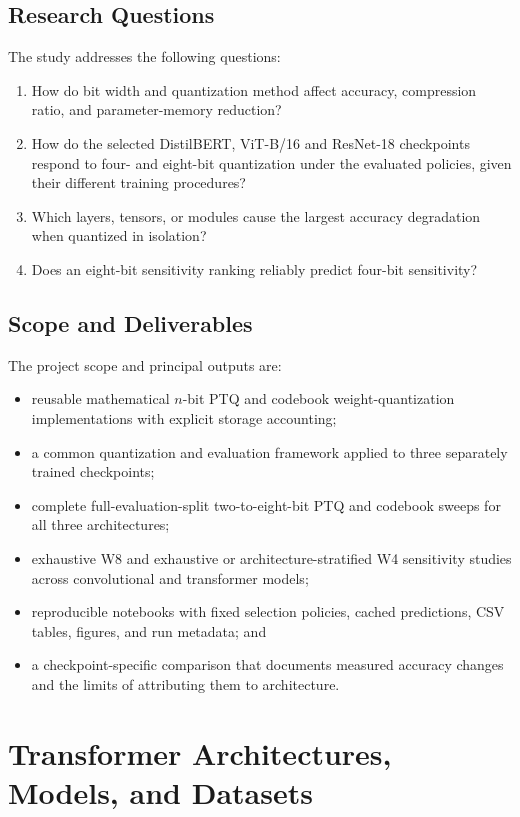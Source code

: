 \documentclass[conference]{IEEEtran}
\begin{document}
\subsection{Research Questions}

The study addresses the following questions:
\begin{enumerate}
    \item How do bit width and quantization method affect accuracy, compression ratio, and parameter-memory reduction?
    \item How do the selected DistilBERT, ViT-B/16 and ResNet-18 checkpoints respond to four- and eight-bit quantization under the evaluated policies, given their different training procedures?
    \item Which layers, tensors, or modules cause the largest accuracy degradation when quantized in isolation?
    \item Does an eight-bit sensitivity ranking reliably predict four-bit sensitivity?
\end{enumerate}

\subsection{Scope and Deliverables}

The project scope and principal outputs are:
\begin{itemize}
    \item reusable mathematical $n$-bit PTQ and codebook weight-quantization implementations with explicit storage accounting;
    \item a common quantization and evaluation framework applied to three separately trained checkpoints;
    \item complete full-evaluation-split two-to-eight-bit PTQ and codebook sweeps for all three architectures;
    \item exhaustive W8 and exhaustive or architecture-stratified W4 sensitivity studies across convolutional and transformer models;
    \item reproducible notebooks with fixed selection policies, cached predictions, CSV tables, figures, and run metadata; and
    \item a checkpoint-specific comparison that documents measured accuracy changes and the limits of attributing them to architecture.
\end{itemize}

\section{Transformer Architectures, Models, and Datasets}
\label{sec:models-datasets}
\end{document}

